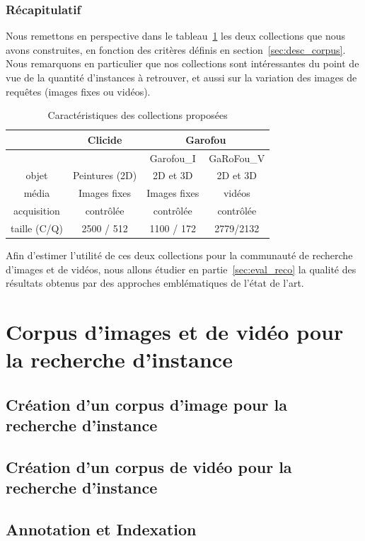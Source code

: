 \subsection{Récapitulatif}
\label{subsec:recap}

Nous remettons en perspective dans le tableau~\ref{tab:recap_corpus} les deux collections que nous avons construites, en fonction des critères définis en section~\ref{sec:desc_corpus}. 
Nous remarquons en particulier que nos collections sont intéressantes du point de vue de la quantité d'instances à retrouver, et aussi sur la variation des images de requêtes (images fixes ou vidéos).

\begin{table}[htb]
    \centering
    \begin{tabular}{| c || c | c | c |}
    \hline 
    & Clicide & \multicolumn{2}{|c|}{Garofou} \\
    \hline
    &  & Garofou\_I & GaRoFou\_V \\
    \hline 
    \hline
    objet & Peintures (2D) & 2D et 3D &  2D et 3D \\
    \hline    
    média & Images fixes & Images fixes  & vidéos \\
    \hline
    acquisition & contrôlée &  contrôlée  &  contrôlée \\
    \hline
    taille (C/Q) & 2500 / 512 & 1100 / 172 & 2779/2132 \\
    \hline
    \end{tabular}
    \caption{Caractéristiques des collections proposées}
    \label{tab:recap_corpus}
\end{table}

Afin d'estimer l'utilité de ces deux collections pour la communauté de recherche d'images et de vidéos, nous allons étudier en partie~\ref{sec:eval_reco} la qualité des résultats obtenus par des approches emblématiques de l'état de l'art.



\chapter{Corpus d'images et de vidéo pour la recherche d'instance}

\section{Création d'un corpus d'image pour la recherche d'instance}

\section{Création d'un corpus de vidéo pour la recherche d'instance}

\section{Annotation et Indexation}

